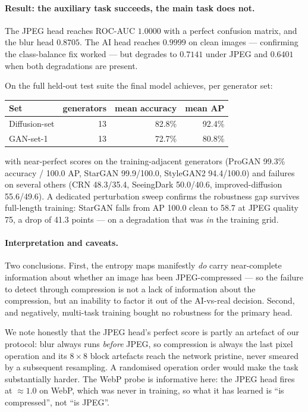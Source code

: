 \paragraph{Result: the auxiliary task succeeds, the main task does not.} The
JPEG head reaches ROC-AUC $1.0000$ with a perfect confusion matrix, and the blur
head $0.8705$. The AI head reaches $0.9999$ on clean images --- confirming the
class-balance fix worked --- but degrades to $0.7141$ under JPEG and $0.6401$
when both degradations are present.

On the full held-out test suite the final model achieves, per generator set:

\begin{center}
\begin{tabular}{lrrr}
  \toprule
  Set & generators & mean accuracy & mean AP \\
  \midrule
  Diffusion-set & 13 & 82.8\% & 92.4\% \\
  GAN-set-1     & 13 & 72.7\% & 80.8\% \\
  \bottomrule
\end{tabular}
\end{center}

with near-perfect scores on the training-adjacent generators (ProGAN 99.3\%
accuracy / 100.0 AP, StarGAN 99.9/100.0, StyleGAN2 94.4/100.0) and failures on
several others (CRN 48.3/35.4, SeeingDark 50.0/40.6, improved-diffusion
55.6/49.6). A dedicated perturbation sweep confirms the robustness gap survives
full-length training: StarGAN falls from AP 100.0 clean to 58.7 at JPEG quality
75, a drop of 41.3 points --- on a degradation that was \emph{in} the training
grid.

\paragraph{Interpretation and caveats.} Two conclusions. First, the entropy maps
manifestly \emph{do} carry near-complete information about whether an image has
been JPEG-compressed --- so the failure to detect through compression is not a
lack of information about the compression, but an inability to factor it out of
the AI-vs-real decision. Second, and negatively, multi-task training bought no
robustness for the primary head.

We note honestly that the JPEG head's perfect score is partly an artefact of our
protocol: blur always runs \emph{before} JPEG, so compression is always the last
pixel operation and its $8\times8$ block artefacts reach the network pristine,
never smeared by a subsequent resampling. A randomised operation order would
make the task substantially harder. The WebP probe is informative here: the JPEG
head fires at $\approx1.0$ on WebP, which was never in training, so what it has
learned is ``is compressed'', not ``is JPEG''.

